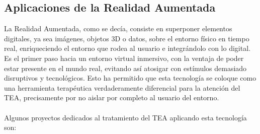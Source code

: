 \documentclass[12pt,twoside,titlepage]{report}
\begin{document}
\subsection{Aplicaciones de la Realidad Aumentada}

La Realidad Aumentada, como se decía, consiste en superponer elementos digitales, ya sea imágenes, objetos 3D o datos, sobre el entorno físico en tiempo real, enriqueciendo el entorno que rodea al usuario e integrándolo con lo digital.
Es el primer paso hacia un entorno virtual inmersivo, con la ventaja de poder estar presente en el mundo real, evitando así atosigar con estímulos demasiado disruptivos y tecnológicos.
Esto ha permitido que esta tecnología se coloque como una herramienta terapéutica verdaderamente diferencial para la atención del TEA, precisamente por no aislar por completo al usuario del entorno.\\
\\
Algunos proyectos dedicados al tratamiento del TEA aplicando esta tecnología son:
\end{document}
